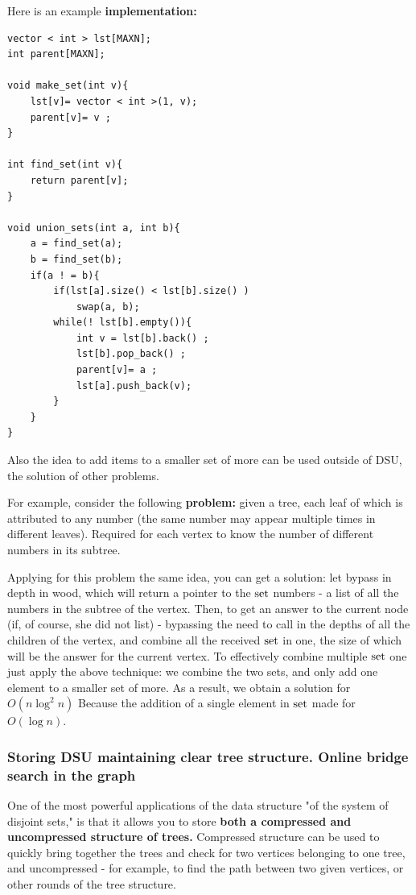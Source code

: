 Here is an example \textbf{implementation:}

\begin{verbatim}
vector < int > lst[MAXN];
int parent[MAXN];
 
void make_set(int v){
    lst[v]= vector < int >(1, v);
    parent[v]= v ;
}
 
int find_set(int v){
    return parent[v];
}
 
void union_sets(int a, int b){
    a = find_set(a);
    b = find_set(b);
    if(a ! = b){
        if(lst[a].size() < lst[b].size() )
            swap(a, b);
        while(! lst[b].empty()){
            int v = lst[b].back() ;
            lst[b].pop_back() ;
            parent[v]= a ;
            lst[a].push_back(v);
        }
    }
} 
\end{verbatim}
Also the idea to add items to a smaller set of more can be used outside of DSU, the solution of other problems.

For example, consider the following \textbf{problem:} given a tree, each leaf of which is attributed to any number (the same number may appear multiple times in different leaves). Required for each vertex to know the number of different numbers in its subtree.

Applying for this problem the same idea, you can get a solution: let bypass in depth in wood, which will return a pointer to the ${\rm set}$ numbers - a list of all the numbers in the subtree of the vertex. Then, to get an answer to the current node (if, of course, she did not list) - bypassing the need to call in the depths of all the children of the vertex, and combine all the received ${\rm set}$ in one, the size of which will be the answer for the current vertex. To effectively combine multiple ${\rm set}$ one just apply the above technique: we combine the two sets, and only add one element to a smaller set of more. As a result, we obtain a solution for $O (n \log ^ 2 n)$ Because the addition of a single element in ${\rm set}$ made for $O (\log n)$.

\subsubsection{ Storing DSU maintaining clear tree structure. Online bridge search in the graph }

One of the most powerful applications of the data structure "of the system of disjoint sets," is that it allows you to store \textbf{both a compressed and uncompressed structure of trees.} Compressed structure can be used to quickly bring together the trees and check for two vertices belonging to one tree, and uncompressed - for example, to find the path between two given vertices, or other rounds of the tree structure.

